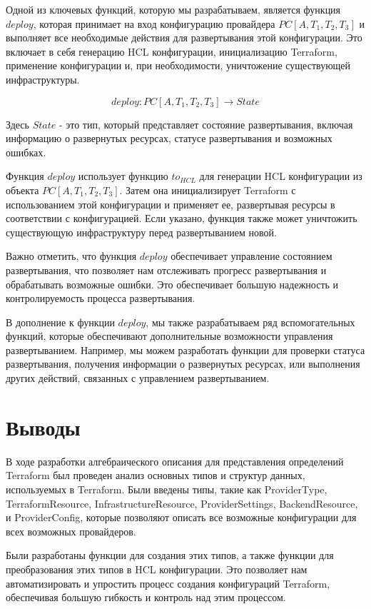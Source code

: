 Одной из ключевых функций, которую мы разрабатываем, является функция $deploy$,
которая принимает на вход конфигурацию провайдера $PC[A, T_1, T_2, T_3]$ и
выполняет все необходимые действия для развертывания этой конфигурации. Это
включает в себя генерацию HCL конфигурации, инициализацию Terraform, применение
конфигурации и, при необходимости, уничтожение существующей инфраструктуры.

$$
deploy: PC[A, T_1, T_2, T_3] \rightarrow State
$$

Здесь $State$ - это тип, который представляет состояние развертывания, включая
информацию о развернутых ресурсах, статусе развертывания и возможных ошибках.

Функция $deploy$ использует функцию $to_{HCL}$ для генерации HCL конфигурации из
объекта $PC[A, T_1, T_2, T_3]$. Затем она инициализирует Terraform с
использованием этой конфигурации и применяет ее, развертывая ресурсы в
соответствии с конфигурацией. Если указано, функция также может уничтожить
существующую инфраструктуру перед развертыванием новой.

Важно отметить, что функция $deploy$ обеспечивает управление состоянием
развертывания, что позволяет нам отслеживать прогресс развертывания и
обрабатывать возможные ошибки. Это обеспечивает большую надежность и
контролируемость процесса развертывания.

В дополнение к функции $deploy$, мы также разрабатываем ряд вспомогательных
функций, которые обеспечивают дополнительные возможности управления
развертыванием. Например, мы можем разработать функции для проверки статуса
развертывания, получения информации о развернутых ресурсах, или выполнения
других действий, связанных с управлением развертыванием.

\section{Выводы}

В ходе разработки алгебраического описания для представления определений
Terraform был проведен анализ основных типов и структур данных, используемых в
Terraform. Были введены типы, такие как ProviderType, TerraformResource,
InfrastructureResource, \newline ProviderSettings, BackendResource, и
ProviderConfig,
которые позволяют описать все возможные конфигурации для всех возможных
провайдеров.

Были разработаны функции для создания этих типов, а также функции для
преобразования этих типов в HCL конфигурации. Это позволяет нам автоматизировать
и упростить процесс создания конфигураций Terraform, обеспечивая большую
гибкость и контроль над этим процессом.

